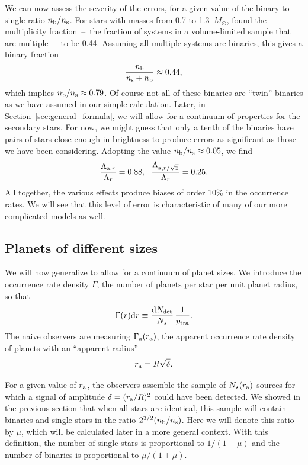 \documentclass[12pt,modern,trackchanges]{aastex61}
\renewcommand{\a}{_{\rm a}}
\newcommand{\s}{_{\rm s}}
\renewcommand{\b}{_{\rm b}}
\begin{document}
We can now assess the severity of the errors, for a given value of the
binary-to-single ratio $n\b/n\s$. For stars with masses from 0.7 to
1.3~$M_\odot$, \citet{raghavan_survey_2010} found the multiplicity
fraction~--~the fraction of systems in a volume-limited sample that
are multiple~--~to be 0.44.  Assuming all multiple systems are
binaries, this gives a binary fraction
\begin{equation}
  \frac{n\b}{n\s + n\b} \approx 0.44,
\end{equation}
which implies $n\b/n\s \approx 0.79$.  Of course not all of these
binaries are ``twin'' binaries as we have assumed in our simple
calculation.  Later, in Section~\ref{sec:general_formula}, we will
allow for a continuum of properties for the secondary stars. For now,
we might guess that only a tenth of the binaries have pairs of stars
close enough in brightness to produce errors as significant as those
we have been considering.  Adopting the value $n\b/n\s\approx0.05$, we
find
\begin{equation}
    \frac{\Lambda_{{\rm{a}},r}}{\Lambda_r} = 0.88,~~
    \frac{\Lambda_{{\rm{a}},r/\sqrt{2}}}{\Lambda_r} = 0.25.
    \label{eq:ratios}
\end{equation}
All together, the various effects produce biases of order 10\% in the
occurrence rates.  We will see that this level of error is
characteristic of many of our more complicated models as well.

\subsection{Planets of different sizes}
\label{sec:model_1_density}

We will now generalize to allow for a continuum of planet sizes.   We
introduce the occurrence rate density $\Gamma$, the number of planets
per star per unit planet radius, so that
\begin{equation}
    \Gamma(r) {\rm d}r \equiv \frac{ {\rm d}N_{\rm det} }{N_\star}
            \, \frac{1}{p_{\rm tra}}.
    \label{eq:rate_density_defn}
\end{equation}
The naive observers are measuring $\Gamma\a(r\a)$, the apparent
occurrence rate density of planets with an ``apparent radius''
\begin{equation}
  r\a = R \sqrt{\delta}.
\end{equation}

For a given value of $r\a$, the observers assemble the sample of
$N_\star(r\a)$ sources for which a signal of amplitude $\delta =
(r\a/R)^2$ could have been detected.  We showed in the previous
section that when all stars are identical, this sample will contain
binaries and single stars in the ratio $2^{3/2}(n\b/n\s)$.  Here we
will denote this ratio by $\mu$, which will be calculated later in a
more general context.  With this definition, the number of single
stars is proportional to $1/(1+\mu)$ and the number of binaries is
proportional to $\mu/(1+\mu)$.
\end{document}
